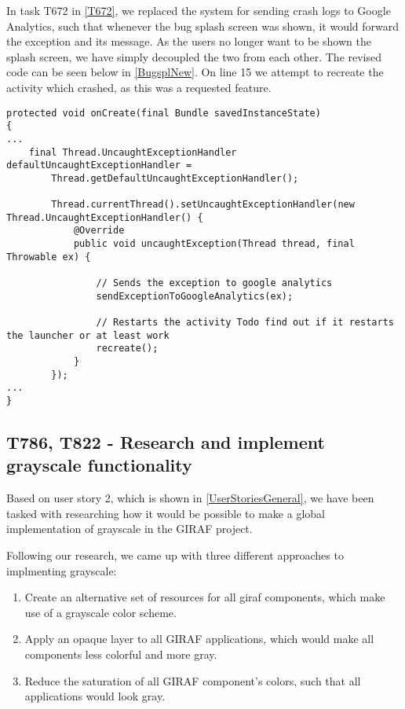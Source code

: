 In task T672 in \autoref{T672}, we replaced the system for sending crash logs to
Google Analytics, such that whenever the bug splash screen was shown, it would
forward the exception and its message. As the users no longer want to be shown
the splash screen, we have simply decoupled the two from each other. The revised
code can be seen below in \autoref{BugsplNew}. On line 15 we attempt to recreate
the activity which crashed, as this was a requested feature.\nl

\begin{minipage}[H]{\linewidth}
\begin{lstlisting}[caption = We use Google Analytics and try to recreate the activity, label = BugsplNew] 
protected void onCreate(final Bundle savedInstanceState) 
{ 
...
	final Thread.UncaughtExceptionHandler defaultUncaughtExceptionHandler =
    	Thread.getDefaultUncaughtExceptionHandler();

        Thread.currentThread().setUncaughtExceptionHandler(new Thread.UncaughtExceptionHandler() {
            @Override
            public void uncaughtException(Thread thread, final Throwable ex) {

                // Sends the exception to google analytics
                sendExceptionToGoogleAnalytics(ex);

                // Restarts the activity Todo find out if it restarts the launcher or at least work
                recreate();
            }
        });
...
}
\end{lstlisting}
\end{minipage}

\subsection{T786, T822 - Research and implement grayscale functionality}
Based on user story 2, which is shown in \autoref{UserStoriesGeneral}, we have
been tasked with researching how it would be possible to make a global
implementation of grayscale in the GIRAF project.\nl

Following our research, we came up with three different approaches to
implmenting grayscale:

\begin{enumerate}
  \item Create an alternative set of resources for all giraf components, which
  make use of a grayscale color scheme.
  \item Apply an opaque layer to all GIRAF applications, which would make all
  components less colorful and more gray.
  \item Reduce the saturation of all GIRAF component's colors, such that all
  applications would look gray.
\end{enumerate}

